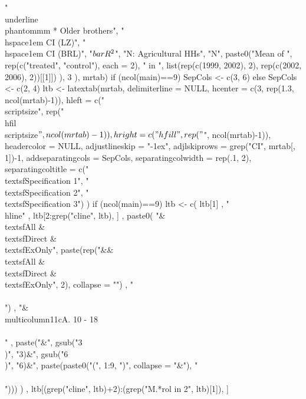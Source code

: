 \begin{Schunk}
\begin{Sinput}
{          "\\underline{\\phantom{mm}} * Older brothers",
          "\\hspace{1em} CI (LZ)", "\\hspace{1em} CI (BRL)", 
          "$\\bar{R}^{2}$", "N: Agricultural HHs", "N",
          paste0("Mean of ", rep(c("treated", "control"), each = 2), " in ", 
            list(rep(c(1999, 2002), 2), rep(c(2002, 2006), 2))[[1]])
           ), 3
        ), 
     mrtab)
  if (ncol(main)==9) SepCols <- c(3, 6) else SepCols <- c(2, 4) 
  ltb <- latextab(mrtab, delimiterline = NULL, 
      hcenter = c(3, rep(1.3, ncol(mrtab)-1)),
      hleft = c("\\scriptsize", rep("\\hfil\\scriptsize$", ncol(mrtab)-1)), 
      hright = c("\\hfill", rep("$", ncol(mrtab)-1)),
      headercolor = NULL, 
      adjustlineskip = "-1ex", adjlskiprows = grep("CI", mrtab[, 1])-1,
      addseparatingcols = SepCols, separatingcolwidth = rep(.1, 2), 
      separatingcoltitle = c("\\textsf{Specification 1}", "\\textsf{Specification 2}", "\\textsf{Specification 3}")
    ) 
  if (ncol(main)==9) 
    ltb <- c(
      ltb[1]
      , 
      "\\hline"
      , 
      ltb[2:grep("cline", ltb), ]
      ,
      paste0(
        "&\\textsf{All} & \\textsf{Direct} & \\textsf{ExOnly}",
        paste(rep("&&\\textsf{All} & \\textsf{Direct} & \\textsf{ExOnly}", 2), collapse = "")
        , "\\\\")
      ,
      "&\\multicolumn{11}{c}{A. 10 - 18}\\\\"
      ,
      paste("&",
        gsub("3\\)", "3)&", gsub("6\\)", "6)&", paste(paste0("(", 1:9, ")", collapse = "&"), "\\\\")))
        )
      ,
      ltb[(grep("cline", ltb)+2):(grep("M.*rol in 2", ltb)[1]), ]
}
\end{Sinput}
\end{Schunk}
